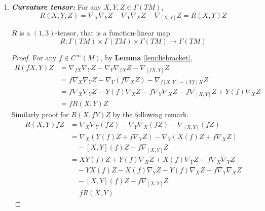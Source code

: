 \begin{enumerate}[label=\arabic{*}.]
	\item \emph{\textbf{Curvature tensor:}} For any $X,Y,Z \in \Gamma(TM)$,
	\begin{equation*}
		R(X,Y,Z) = \nabla_X\nabla_YZ-\nabla_Y\nabla_XZ -\nabla_{[X,Y]}Z = R(X,Y)Z
	\end{equation*}
	\begin{prop}
		$R$ is a $(1,3)$-tensor, that is a function-linear map
		\begin{equation*}
			R \colon \Gamma(TM) \times \Gamma(TM) \times \Gamma(TM) \longrightarrow \Gamma(TM)
		\end{equation*}
	\end{prop}
	\begin{proof}
		For any $f \in C^\infty(M)$, by \textbf{Lemma} \ref{lem:liebracket},
		\begin{equation*}
			\begin{aligned}
				R(fX,Y)Z &= \nabla_{fX}\nabla_YZ - \nabla_Y\nabla_{fX}Z -\nabla_{[fX,Y]}Z \\
				&= f\nabla_{X}\nabla_YZ - \nabla_Y(f\nabla_{X}Z) - \nabla_{f[X,Y]-(Yf)X}Z \\
				&= f\nabla_{X}\nabla_YZ - Y(f)\nabla_{X}Z -f\nabla_Y\nabla_{X}Z-f\nabla_{[X,Y]}Z + Y(f)\nabla_{X}Z \\
				&= fR(X,Y)Z
			\end{aligned}
		\end{equation*}
		Similarly proof for $R(X,fY)Z$ by the following remark.
		\begin{equation*}
			\begin{aligned}
				R(X,Y)fZ &= \nabla_X\nabla_Y(fZ)-\nabla_Y\nabla_X(fZ) -\nabla_{[X,Y]}(fZ) \\
				&= \nabla_X(Y(f)Z+ f\nabla_YZ) - \nabla_Y(X(f)Z+f\nabla_{X}Z)\\
				&\quad - [X,Y](f)Z  - f\nabla_{[X,Y]}Z \\
				&= XY(f)Z+Y(f)\nabla_{X}Z+X(f)\nabla_YZ+f\nabla_{X}\nabla_YZ \\
				&\quad - YX(f)Z - X(f)\nabla_YZ - Y(f)\nabla_{X}Z - f\nabla_Y\nabla_{X}Z \\
				&\quad - [X,Y](f)Z  - f\nabla_{[X,Y]}Z \\
				&= fR(X,Y)
			\end{aligned}
		\end{equation*}
	\end{proof}
	

\end{enumerate}
